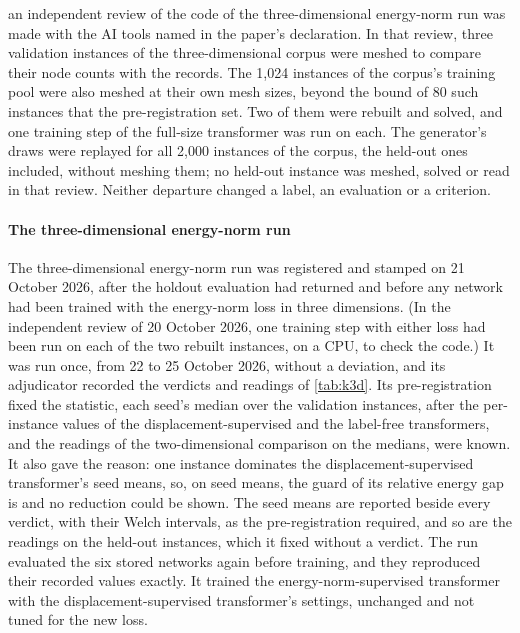 an independent review of the code of the three-dimensional energy-norm run was made with
the AI tools named in the paper's declaration. In that review, three validation instances of
the three-dimensional corpus were meshed to compare their node counts with the records. The
1,024 instances of the corpus's training pool were also meshed at their own mesh sizes,
beyond the bound of 80 such instances that the pre-registration set. Two of them were rebuilt
and solved, and one training step of the full-size transformer was run on each. The
generator's draws were replayed for all 2,000 instances of the corpus, the held-out ones
included, without meshing them; no held-out instance was meshed, solved or read in that review. Neither departure changed a label, an
evaluation or a criterion.



\paragraph{The three-dimensional energy-norm run}
The three-dimensional energy-norm run was registered and stamped on 21 October 2026, after
the holdout evaluation had returned and before any network had been trained with the energy-norm loss in three dimensions. (In the independent review of 20 October 2026,
one training step with either loss had been run on each of the two rebuilt instances, on a
CPU, to check the code.) It was run once, from 22 to 25 October 2026, without a deviation, and its adjudicator
recorded the verdicts and readings of
\cref{tab:k3d}. Its pre-registration fixed the statistic, each seed's median over the
validation instances, after the per-instance values of the displacement-supervised and the
label-free transformers, and the readings of the two-dimensional comparison on the medians, were known. It also gave
the reason: one instance dominates the displacement-supervised
transformer's seed means, so, on seed means, the guard of its relative energy gap is
\numKdMeansGapTau{} and no reduction could be shown. The seed means are reported beside
every verdict, with their Welch intervals, as the pre-registration required, and so are the
readings on the held-out instances, which it fixed without a verdict. The run evaluated the
six stored networks again before training, and they reproduced their recorded values exactly. It trained the energy-norm-supervised
transformer with the displacement-supervised
transformer's settings, unchanged and not tuned for the new loss.

